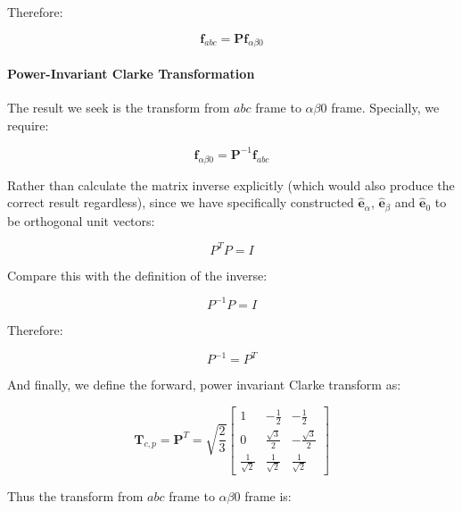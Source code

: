 \documentclass{article}
\begin{document}
Therefore:

\begin{equation}
    \mathbf{f}_{abc} = \mathbf{P}\mathbf{f}_{\alpha\beta0}
\end{equation}


\paragraph{Power-Invariant Clarke Transformation}
The result we seek is the transform from $abc$ frame to $\alpha\beta0$ frame. Specially, we require:

\begin{equation}
    \mathbf{f}_{\alpha\beta0} = \mathbf{P}^{-1} \mathbf{f}_{abc}
\end{equation}

Rather than calculate the matrix inverse explicitly (which would also produce the correct result regardless), since we have specifically constructed $\mathbf{\hat{e}}_\alpha$, $\mathbf{\hat{e}}_\beta$ and $\mathbf{\hat{e}}_0$ to be orthogonal unit vectors:

\begin{equation}
    P^TP = I
\end{equation}

Compare this with the definition of the inverse:

\begin{equation}
    P^{-1}P = I
\end{equation}

Therefore:

\begin{equation}
    P^{-1} = P^T
\end{equation}

And finally, we define the forward, power invariant Clarke transform as:

\begin{equation}
    \mathbf{T}_{c,p} = \mathbf{P}^{T}
    =
    \sqrt{\frac{2}{3}}
    \begin{bmatrix}
        1 & -\frac{1}{2} & -\frac{1}{2} \\[2mm]
        0 & \frac{\sqrt{3}}{2} & -\frac{\sqrt{3}}{2} \\[2mm]
        \frac{1}{\sqrt{2}} & \frac{1}{\sqrt{2}} & \frac{1}{\sqrt{2}}
    \end{bmatrix}
\end{equation}

Thus the transform from $abc$ frame to $\alpha\beta0$ frame is:
\end{document}
